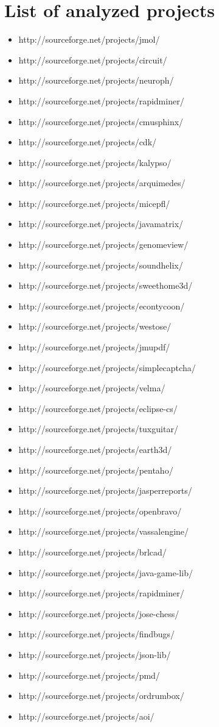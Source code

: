 \appendix
\chapter{List of analyzed projects}\label{ap:projects}
\begin{itemize}
\item http://sourceforge.net/projects/jmol/
\item http://sourceforge.net/projects/circuit/
\item http://sourceforge.net/projects/neuroph/
\item http://sourceforge.net/projects/rapidminer/
\item http://sourceforge.net/projects/cmusphinx/
\item http://sourceforge.net/projects/cdk/
\item http://sourceforge.net/projects/kalypso/
\item http://sourceforge.net/projects/arquimedes/
\item http://sourceforge.net/projects/micepfl/
\item http://sourceforge.net/projects/javamatrix/
\item http://sourceforge.net/projects/genomeview/
\item http://sourceforge.net/projects/soundhelix/
\item http://sourceforge.net/projects/sweethome3d/
\item http://sourceforge.net/projects/econtycoon/
\item http://sourceforge.net/projects/westose/
\item http://sourceforge.net/projects/jmupdf/
\item http://sourceforge.net/projects/simplecaptcha/
\item http://sourceforge.net/projects/velma/
\item http://sourceforge.net/projects/eclipse-cs/
\item http://sourceforge.net/projects/tuxguitar/
\item http://sourceforge.net/projects/earth3d/
\item http://sourceforge.net/projects/pentaho/
\item http://sourceforge.net/projects/jasperreports/
\item http://sourceforge.net/projects/openbravo/
\item http://sourceforge.net/projects/vassalengine/
\item http://sourceforge.net/projects/brlcad/
\item http://sourceforge.net/projects/java-game-lib/
\item http://sourceforge.net/projects/rapidminer/
\item http://sourceforge.net/projects/jose-chess/
\item http://sourceforge.net/projects/findbugs/
\item http://sourceforge.net/projects/json-lib/
\item http://sourceforge.net/projects/pmd/ 
\item http://sourceforge.net/projects/ordrumbox/
\item http://sourceforge.net/projects/aoi/

\end{itemize}